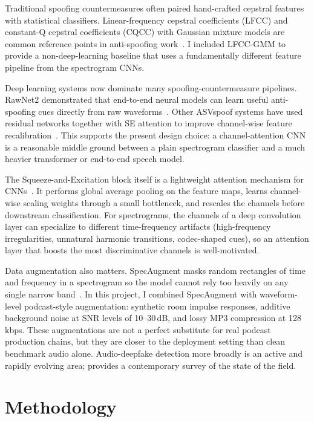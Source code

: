 \documentclass[11pt, letterpaper]{article}
\begin{document}
Traditional spoofing countermeasures often paired hand-crafted cepstral features with statistical classifiers. Linear-frequency cepstral coefficients (LFCC) and constant-Q cepstral coefficients (CQCC) with Gaussian mixture models are common reference points in anti-spoofing work~\cite{todisco2017cqcc, sahidullah2015features}. I included LFCC-GMM to provide a non-deep-learning baseline that uses a fundamentally different feature pipeline from the spectrogram CNNs.

Deep learning systems now dominate many spoofing-countermeasure pipelines. RawNet2 demonstrated that end-to-end neural models can learn useful anti-spoofing cues directly from raw waveforms~\cite{tak2021rawnet2}. Other ASVspoof systems have used residual networks together with SE attention to improve channel-wise feature recalibration~\cite{lai2019assert, he2016resnet}. This supports the present design choice: a channel-attention CNN is a reasonable middle ground between a plain spectrogram classifier and a much heavier transformer or end-to-end speech model.

The Squeeze-and-Excitation block itself is a lightweight attention mechanism for CNNs~\cite{hu2018senet}. It performs global average pooling on the feature maps, learns channel-wise scaling weights through a small bottleneck, and rescales the channels before downstream classification. For spectrograms, the channels of a deep convolution layer can specialize to different time-frequency artifacts (high-frequency irregularities, unnatural harmonic transitions, codec-shaped cues), so an attention layer that boosts the most discriminative channels is well-motivated.

Data augmentation also matters. SpecAugment masks random rectangles of time and frequency in a spectrogram so the model cannot rely too heavily on any single narrow band~\cite{park2019specaugment}. In this project, I combined SpecAugment with waveform-level podcast-style augmentation: synthetic room impulse responses, additive background noise at SNR levels of 10--30\,dB, and lossy MP3 compression at 128\,kbps. These augmentations are not a perfect substitute for real podcast production chains, but they are closer to the deployment setting than clean benchmark audio alone. Audio-deepfake detection more broadly is an active and rapidly evolving area; \cite{yi2023survey} provides a contemporary survey of the state of the field.

\section{Methodology}\label{sec:method}
\end{document}
